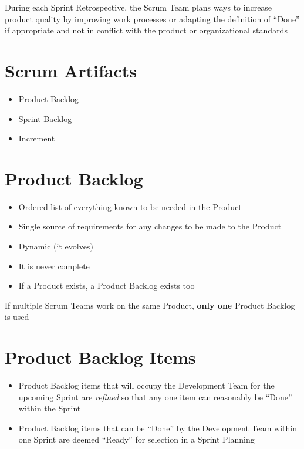 \documentclass[a4paper,11pt,twocolumn]{article}
\begin{document}
\begin{tcolorbox}[colback=black!8!white,colframe=gray!50!black,title=Note,sharp corners,fonttitle=\normalsize\bfseries,fontupper=\normalsize,left=0.7em,right=0.7em]
	During each Sprint Retrospective, the Scrum Team plans ways to increase product quality by improving work processes or adapting the definition of ``Done'' if appropriate and not in conflict with the product or organizational standards
\end{tcolorbox}

\section*{Scrum Artifacts}
\begin{itemize}
	\item Product Backlog
	\item Sprint Backlog
	\item Increment
\end{itemize}

\section*{Product Backlog}
\begin{itemize}
	\item Ordered list of everything known to be needed in the Product
	\item Single source of requirements for any changes to be made to the Product
	\item Dynamic (it evolves)
	\item It is never complete
	\item If a Product exists, a Product Backlog exists too
\end{itemize}

\begin{tcolorbox}[colback=black!8!white,colframe=gray!50!black,title=Note,sharp corners,fonttitle=\normalsize\bfseries,fontupper=\normalsize,left=0.7em,right=0.7em]
	If multiple Scrum Teams work on the same Product, \textbf{only one} Product Backlog is used
\end{tcolorbox}

\section*{Product Backlog Items}
\begin{itemize}
	\item Product Backlog items that will occupy the Development Team for the upcoming Sprint are \textit{refined} so that any one item can reasonably be ``Done'' within the Sprint
    \item Product Backlog items that can be ``Done'' by the Development Team within one Sprint are deemed ``Ready'' for selection in a Sprint Planning
\end{itemize}
\end{document}
